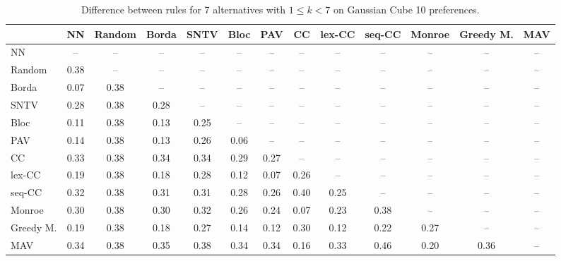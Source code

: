 
\begin{table*}[htbp]
\centering
\begin{tabular}{lcccccccccccc}
\toprule
 & NN & Random & Borda & SNTV & Bloc & PAV & CC & lex-CC & seq-CC & Monroe & Greedy M. & MAV \\
\midrule
NN & -- & -- & -- & -- & -- & -- & -- & -- & -- & -- & -- & -- \\
Random & \cellcolor{blue!38} 0.38 & -- & -- & -- & -- & -- & -- & -- & -- & -- & -- & -- \\
Borda & \cellcolor{blue!7} 0.07 & \cellcolor{blue!38} 0.38 & -- & -- & -- & -- & -- & -- & -- & -- & -- & -- \\
SNTV & \cellcolor{blue!28} 0.28 & \cellcolor{blue!38} 0.38 & \cellcolor{blue!28} 0.28 & -- & -- & -- & -- & -- & -- & -- & -- & -- \\
Bloc & \cellcolor{blue!11} 0.11 & \cellcolor{blue!38} 0.38 & \cellcolor{blue!13} 0.13 & \cellcolor{blue!25} 0.25 & -- & -- & -- & -- & -- & -- & -- & -- \\
PAV & \cellcolor{blue!14} 0.14 & \cellcolor{blue!38} 0.38 & \cellcolor{blue!13} 0.13 & \cellcolor{blue!26} 0.26 & \cellcolor{blue!6} 0.06 & -- & -- & -- & -- & -- & -- & -- \\
CC & \cellcolor{blue!33} 0.33 & \cellcolor{blue!38} 0.38 & \cellcolor{blue!34} 0.34 & \cellcolor{blue!34} 0.34 & \cellcolor{blue!28} 0.29 & \cellcolor{blue!27} 0.27 & -- & -- & -- & -- & -- & -- \\
lex-CC & \cellcolor{blue!19} 0.19 & \cellcolor{blue!38} 0.38 & \cellcolor{blue!18} 0.18 & \cellcolor{blue!28} 0.28 & \cellcolor{blue!12} 0.12 & \cellcolor{blue!7} 0.07 & \cellcolor{blue!26} 0.26 & -- & -- & -- & -- & -- \\
seq-CC & \cellcolor{blue!32} 0.32 & \cellcolor{blue!38} 0.38 & \cellcolor{blue!31} 0.31 & \cellcolor{blue!31} 0.31 & \cellcolor{blue!28} 0.28 & \cellcolor{blue!26} 0.26 & \cellcolor{blue!40} 0.40 & \cellcolor{blue!25} 0.25 & -- & -- & -- & -- \\
Monroe & \cellcolor{blue!30} 0.30 & \cellcolor{blue!38} 0.38 & \cellcolor{blue!30} 0.30 & \cellcolor{blue!32} 0.32 & \cellcolor{blue!26} 0.26 & \cellcolor{blue!24} 0.24 & \cellcolor{blue!7} 0.07 & \cellcolor{blue!23} 0.23 & \cellcolor{blue!38} 0.38 & -- & -- & -- \\
Greedy M. & \cellcolor{blue!19} 0.19 & \cellcolor{blue!38} 0.38 & \cellcolor{blue!18} 0.18 & \cellcolor{blue!27} 0.27 & \cellcolor{blue!14} 0.14 & \cellcolor{blue!12} 0.12 & \cellcolor{blue!30} 0.30 & \cellcolor{blue!12} 0.12 & \cellcolor{blue!22} 0.22 & \cellcolor{blue!27} 0.27 & -- & -- \\
MAV & \cellcolor{blue!34} 0.34 & \cellcolor{blue!38} 0.38 & \cellcolor{blue!35} 0.35 & \cellcolor{blue!38} 0.38 & \cellcolor{blue!34} 0.34 & \cellcolor{blue!34} 0.34 & \cellcolor{blue!16} 0.16 & \cellcolor{blue!33} 0.33 & \cellcolor{blue!46} 0.46 & \cellcolor{blue!20} 0.20 & \cellcolor{blue!36} 0.36 & -- \\
\bottomrule
\end{tabular}

\caption{Difference between rules for 7 alternatives with $1 \leq k < 7$ on Gaussian Cube 10 preferences.}
\label{tab:rule_distance_heatmap-m=[7]-pref_dist=euclidean__args__dimensions=10_-_space=gaussian_cube}
\end{table*}
    